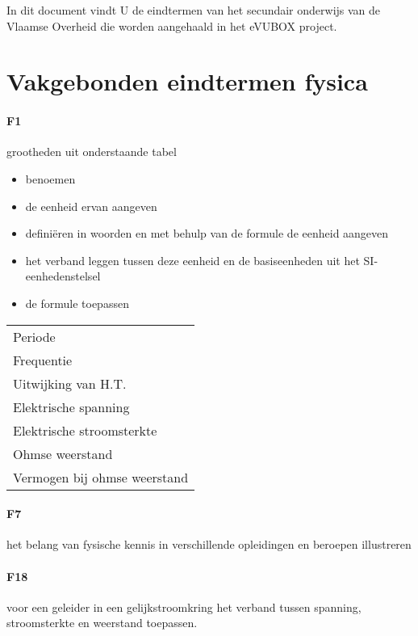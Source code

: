 \documentclass{article}
\begin{document}
	\maketitle
	In dit document vindt U de eindtermen van het secundair onderwijs van de Vlaamse Overheid die worden aangehaald in het eVUBOX project.

	\section{Vakgebonden eindtermen fysica}

		\paragraph*{F1} grootheden uit onderstaande tabel
			\begin{itemize}
				\item benoemen
				\item de eenheid ervan aangeven
				\item defini\"eren in woorden en met behulp van de formule de eenheid aangeven
				\item het verband leggen tussen deze eenheid en de basiseenheden uit het SI-eenhedenstelsel
				\item de formule toepassen
			\end{itemize}

			\begin{table}[h!]
			\centering
				\begin{tabular}{|l|}
				\hline
					Periode  \\ 
					Frequentie  \\
					Uitwijking van H.T.  \\
					Elektrische spanning  \\
					Elektrische stroomsterkte  \\
					Ohmse weerstand  \\
					Vermogen bij ohmse weerstand  \\
				\hline
				\end{tabular}
			\end{table}

		\paragraph*{F7} het belang van fysische kennis in verschillende opleidingen en beroepen illustreren
		\paragraph*{F18}	voor een geleider in een gelijkstroomkring het verband tussen spanning, stroomsterkte en weerstand toepassen.
\end{document}
